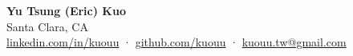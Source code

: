 \begin{center}%
    \textbf{\large{Yu Tsung (Eric) Kuo}} \\
    Santa Clara, CA \\
    \href{https://linkedin.com/in/kuouu}{linkedin.com/in/kuouu} ·
    \href{https://github.com/kuouu}{github.com/kuouu} ·
    \href{mailto:kuouu.tw@gmail.com}{kuouu.tw@gmail.com} 
\end{center}%
